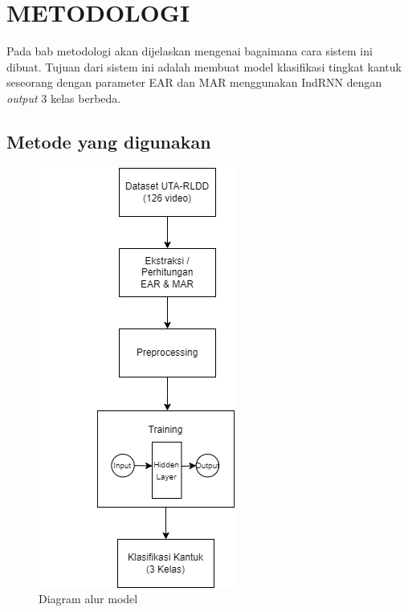 \chapter{METODOLOGI}
\label{chap:desainimplementasi}


Pada bab metodologi akan dijelaskan mengenai bagaimana cara sistem ini
dibuat. Tujuan dari sistem ini adalah membuat model klasifikasi
tingkat kantuk seseorang dengan parameter EAR dan MAR menggunakan IndRNN
dengan \emph{output} 3 kelas berbeda.

\section{Metode yang digunakan}

\begin{figure} [H] \centering
      \includegraphics[scale=0.75]{gambar/metodologi.png}
      \caption{Diagram alur model}
      \label{fig:metodologi}
\end{figure}

